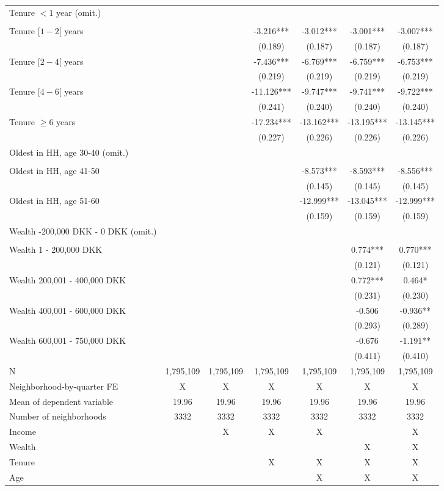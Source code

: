\begin{tabular}{lcccccc}
 Tenure $<1$ year (omit.) &  &  &  &  &  &  \\ 
 &  &  &  &  &  &  \\ 
 Tenure $[1-2[$ years &  &  & -3.216*** & -3.012*** & -3.001*** & -3.007*** \\ 
 &  &  & (0.189) & (0.187) & (0.187) & (0.187) \\ 
Tenure $[2-4[$ years &  &  & -7.436*** & -6.769*** & -6.759*** & -6.753*** \\ 
 &  &  & (0.219) & (0.219) & (0.219) & (0.219) \\ 
Tenure $[4-6[$ years &  &  & -11.126*** & -9.747*** & -9.741*** & -9.722*** \\ 
 &  &  & (0.241) & (0.240) & (0.240) & (0.240) \\ 
Tenure $\geq 6$ years &  &  & -17.234*** & -13.162*** & -13.195*** & -13.145*** \\ 
 &  &  & (0.227) & (0.226) & (0.226) & (0.226) \\ 
Oldest in HH, age 30-40 (omit.) &  &  &  &  &  &  \\ 
 &  &  &  & &  &  \\ 
Oldest in HH, age 41-50 &  &  &  & -8.573*** & -8.593*** & -8.556*** \\ 
 &  &  &  & (0.145) & (0.145) & (0.145) \\ 
Oldest in HH, age 51-60 &  &  &  & -12.999*** & -13.045*** & -12.999*** \\ 
 &  &  &  & (0.159) & (0.159) & (0.159) \\ 
Wealth -200,000 DKK - 0 DKK (omit.) &  &  &  &  &  &  \\ 
 &  &  &  &  &  &  \\ 
 Wealth 1 - 200,000 DKK &  &  &  &  & 0.774*** & 0.770*** \\ 
 &  &  &  &  & (0.121) & (0.121) \\ 
Wealth 200,001 - 400,000 DKK &  &  &  &  & 0.772*** & 0.464* \\ 
 &  &  &  &  & (0.231) & (0.230) \\ 
Wealth 400,001 - 600,000 DKK &  &  &  &  & -0.506 & -0.936** \\ 
 &  &  &  &  & (0.293) & (0.289) \\ 
Wealth 600,001 - 750,000 DKK &  &  &  &  & -0.676 & -1.191** \\ 
 &  &  &  &  & (0.411) & (0.410) \\ 
 \midrule
N & 1,795,109 & 1,795,109 & 1,795,109 & 1,795,109 & 1,795,109 & 1,795,109 \\ 
Neighborhood-by-quarter FE & X & X & X & X & X & X \\ 
Mean of dependent variable & 19.96 & 19.96 & 19.96 & 19.96 & 19.96 & 19.96 \\ 
Number of neighborhoods & 3332 & 3332 & 3332 & 3332 & 3332 & 3332 \\ 
Income &  & X & X & X &  & X \\ 
Wealth &  &  &  &  & X & X \\ 
Tenure &  &  & X & X & X & X \\ 
Age &  &  &  & X & X & X \\ 
\bottomrule
\end{tabular}